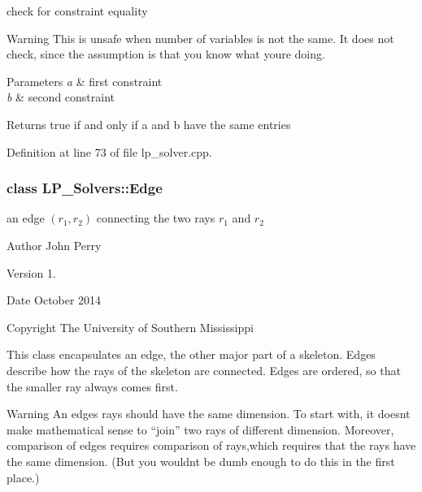 check for constraint equality 

\begin{DoxyWarning}{Warning}
This is unsafe when number of variables is not the same. It does not check, since the assumption is that you know what you\textquotesingle{}re doing. 
\end{DoxyWarning}

\begin{DoxyParams}{Parameters}
{\em a} & first constraint \\
\hline
{\em b} & second constraint \\
\hline
\end{DoxyParams}
\begin{DoxyReturn}{Returns}
{\ttfamily true} if and only if {\ttfamily a} and {\ttfamily b} have the same entries 
\end{DoxyReturn}


Definition at line 73 of file lp\+\_\+solver.\+cpp.

\label{class_l_p___solvers_1_1_edge}
\subsubsection{class L\+P\+\_\+\+Solvers\+:\+:Edge}
an edge $(r_1,r_2)$ connecting the two rays $ r_1 $ and $ r_2 $ 

\begin{DoxyAuthor}{Author}
John Perry 
\end{DoxyAuthor}
\begin{DoxyVersion}{Version}
1. 
\end{DoxyVersion}
\begin{DoxyDate}{Date}
October 2014 
\end{DoxyDate}
\begin{DoxyCopyright}{Copyright}
The University of Southern Mississippi
\end{DoxyCopyright}
This class encapsulates an edge, the other major part of a skeleton. Edges describe how the rays of the skeleton are connected. Edges are ordered, so that the smaller ray always comes first.

\begin{DoxyWarning}{Warning}
An edge\textquotesingle{}s rays should have the same dimension. To start with, it doesn\textquotesingle{}t make mathematical sense to ``join'' two rays of different dimension. Moreover, comparison of edges requires comparison of rays,which requires that the rays have the same dimension. (But you wouldn\textquotesingle{}t be dumb enough to do this in the first place.) 
\end{DoxyWarning}


